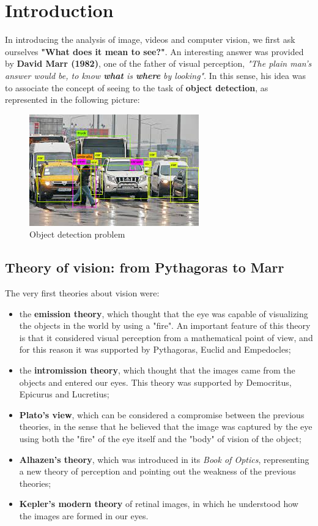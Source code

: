 \section{Introduction} \label{ch1}

In introducing the analysis of image, videos and computer vision, we first ask ourselves \textbf{"What does it mean to see?"}. An interesting answer was provided by \textbf{David Marr (1982)}, one of the father of visual perception, \textit{"The plain man's answer would be, to know \textbf{what} is \textbf{where} by looking"}. In this sense, his idea was to associate the concept of seeing to the task of \textbf{object detection}, as represented in the following picture:

\begin{figure}[h!]
		\centering
		\includegraphics[scale = 0.7]{img/object_detection.jpeg}
        \caption{Object detection problem}
\end{figure}

\subsection{Theory of vision: from Pythagoras to Marr}
The very first theories about vision were:

\begin{itemize}
    \item the \textbf{emission theory}, which thought that the eye was capable of visualizing the objects in the world by using a "fire". An important feature of this theory is that it considered visual perception from a mathematical point of view, and for this reason it was supported by Pythagoras, Euclid and Empedocles;
    \item the \textbf{intromission theory}, which thought that the images came from the objects and entered our eyes. This theory was supported by Democritus, Epicurus and Lucretius;
    \item \textbf{Plato's view}, which can be considered a compromise between the previous theories, in the sense that he believed that the image was captured by the eye using both the "fire" of the eye itself and the "body" of vision of the object;
    \item \textbf{Alhazen's theory}, which was introduced in its \textit{Book of Optics}, representing a new theory of perception and pointing out the weakness of the previous theories;
    \item \textbf{Kepler's modern theory} of retinal images, in which he understood how the images are formed in our eyes.
\end{itemize}

